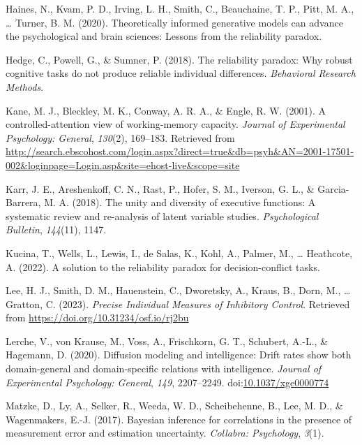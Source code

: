 \documentclass[
  ,man]{apa6}
\newlength{\cslhangindent}
\newlength{\cslentryspacingunit} %
\newenvironment{CSLReferences}[2] %
 {%
  \setlength{\parindent}{0pt}
  \ifodd #1
  \let\oldpar\par
  \def\par{\hangindent=\cslhangindent\oldpar}
  \fi
  \setlength{\parskip}{#2\cslentryspacingunit}
 }%
 {}
\begin{document}
\begin{CSLReferences}{1}{0}
\leavevmode{}%
Haines, N., Kvam, P. D., Irving, L. H., Smith, C., Beauchaine, T. P., Pitt, M. A., \ldots{} Turner, B. M. (2020). Theoretically informed generative models can advance the psychological and brain sciences: {Lessons} from the reliability paradox.

\leavevmode{}%
Hedge, C., Powell, G., \& Sumner, P. (2018). The reliability paradox: {Why} robust cognitive tasks do not produce reliable individual differences. \emph{Behavioral Research Methods}.

\leavevmode{}%
Kane, M. J., Bleckley, M. K., Conway, A. R. A., \& Engle, R. W. (2001). A controlled-attention view of working-memory capacity. \emph{Journal of Experimental Psychology: General}, \emph{130}(2), 169--183. Retrieved from \url{http://search.ebscohost.com/login.aspx?direct=true\&db=psyh\&AN=2001-17501-002\&loginpage=Login.asp\&site=ehost-live\&scope=site}

\leavevmode{}%
Karr, J. E., Areshenkoff, C. N., Rast, P., Hofer, S. M., Iverson, G. L., \& Garcia-Barrera, M. A. (2018). The unity and diversity of executive functions: {A} systematic review and re-analysis of latent variable studies. \emph{Psychological Bulletin}, \emph{144}(11), 1147.

\leavevmode{}%
Kucina, T., Wells, L., Lewis, I., de Salas, K., Kohl, A., Palmer, M., \ldots{} Heathcote, A. (2022). A solution to the reliability paradox for decision-conflict tasks.

\leavevmode{}%
Lee, H. J., Smith, D. M., Hauenstein, C., Dworetsky, A., Kraus, B., Dorn, M., \ldots{} Gratton, C. (2023). \emph{Precise {Individual Measures} of {Inhibitory Control}}. Retrieved from \url{https://doi.org/10.31234/osf.io/rj2bu}

\leavevmode{}%
Lerche, V., von Krause, M., Voss, A., Frischkorn, G. T., Schubert, A.-L., \& Hagemann, D. (2020). Diffusion modeling and intelligence: {Drift} rates show both domain-general and domain-specific relations with intelligence. \emph{Journal of Experimental Psychology: General}, \emph{149}, 2207--2249. doi:\href{https://doi.org/10.1037/xge0000774}{10.1037/xge0000774}

\leavevmode{}%
Matzke, D., Ly, A., Selker, R., Weeda, W. D., Scheibehenne, B., Lee, M. D., \& Wagenmakers, E.-J. (2017). Bayesian inference for correlations in the presence of measurement error and estimation uncertainty. \emph{Collabra: Psychology}, \emph{3}(1).


\end{CSLReferences}
\end{document}
